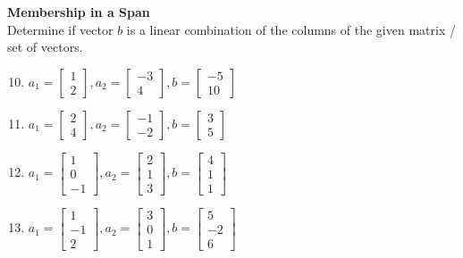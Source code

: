 \documentclass[12pt]{article}
\begin{document}
\textbf{Membership in a Span} \\
Determine if vector $b$ is a linear combination of the columns of the given matrix / set of vectors.
\begin{enumerate}
\setcounter{enumi}{9}
    \item $a_1 = \begin{bmatrix} 1 \\ 2 \end{bmatrix}, a_2 = \begin{bmatrix} -3 \\ 4 \end{bmatrix}, b = \begin{bmatrix} -5 \\ 10 \end{bmatrix}$
    \item $a_1 = \begin{bmatrix} 2 \\ 4 \end{bmatrix}, a_2 = \begin{bmatrix} -1 \\ -2 \end{bmatrix}, b = \begin{bmatrix} 3 \\ 5 \end{bmatrix}$
    \item $a_1 = \begin{bmatrix} 1 \\ 0 \\ -1 \end{bmatrix}, a_2 = \begin{bmatrix} 2 \\ 1 \\ 3 \end{bmatrix}, b = \begin{bmatrix} 4 \\ 1 \\ 1 \end{bmatrix}$
    \item $a_1 = \begin{bmatrix} 1 \\ -1 \\ 2 \end{bmatrix}, a_2 = \begin{bmatrix} 3 \\ 0 \\ 1 \end{bmatrix}, b = \begin{bmatrix} 5 \\ -2 \\ 6 \end{bmatrix}$

\end{enumerate}
\end{document}
